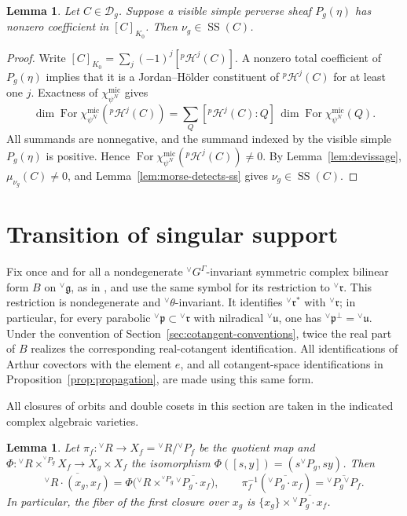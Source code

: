 \documentclass[10pt]{amsart}
\numberwithin{equation}{section}
\theoremstyle{plain}
\newtheorem{lemma}[proposition]{Lemma}
\theoremstyle{definition}
\theoremstyle{remark}
\DeclareMathOperator{\For}{For}
\newcommand{\fg}{\mathfrak g}
\newcommand{\fr}{\mathfrak r}
\newcommand{\fp}{\mathfrak p}
\newcommand{\fu}{\mathfrak u}
\newcommand{\vG}{{}^{\vee}G}
\newcommand{\vR}{{}^{\vee}R}
\newcommand{\vP}{{}^{\vee}P}
\newcommand{\vfg}{{}^{\vee}\fg}
\newcommand{\vfr}{{}^{\vee}\fr}
\newcommand{\vfp}{{}^{\vee}\fp}
\newcommand{\vfu}{{}^{\vee}\fu}
\newcommand{\vtheta}{{}^{\vee}\theta}
\newcommand{\mic}{\mathrm{mic}}
\newcommand{\SSupp}{\operatorname{SS}}
\begin{document}
\begin{lemma}\label{lem:no-cancellation}
Let $C\in\mathcal D_g$. Suppose a visible simple perverse sheaf
$P_g(\eta)$ has nonzero coefficient in $[C]_{K_0}$. Then
$\nu_g\in\SSupp(C)$.
\end{lemma}

\begin{proof}
Write $[C]_{K_0}=\sum_j(-1)^j[{}^p\mathcal H^j(C)]$.
A nonzero total coefficient of $P_g(\eta)$ implies that it is a
Jordan--H\"older constituent of ${}^p\mathcal H^j(C)$ for at least one $j$.
Exactness of $\chi_{\psi^N}^{\mic}$ gives
\[
 \dim\For\chi_{\psi^N}^{\mic}({}^p\mathcal H^j(C))
 =\sum_Q[{}^p\mathcal H^j(C):Q]\,
   \dim\For\chi_{\psi^N}^{\mic}(Q).
\]
All summands are nonnegative, and the summand indexed by the visible
simple $P_g(\eta)$ is positive. Hence
$\For\chi_{\psi^N}^{\mic}({}^p\mathcal H^j(C))\neq0$. By
Lemma~\ref{lem:devissage}, $\mu_{\nu_g}(C)\neq0$, and
Lemma~\ref{lem:morse-detects-ss} gives $\nu_g\in\SSupp(C)$.
\end{proof}

\section{Transition of singular support}

Fix once and for all a nondegenerate $\vG^\Gamma$-invariant symmetric
complex bilinear form $B$ on $\vfg$, as in
\cite[Proposition~3.7.1]{AIMV26}, and use the same symbol for its
restriction to $\vfr$. This restriction is nondegenerate and
$\vtheta$-invariant. It identifies $\vfr^*$ with $\vfr$; in particular,
for every parabolic $\vfp\subset\vfr$ with nilradical $\vfu$, one has
$\vfp^\perp=\vfu$. Under the convention of
Section~\ref{sec:cotangent-conventions}, twice the real part of $B$
realizes the corresponding real-cotangent identification. All
identifications of Arthur covectors with the element $e$, and all
cotangent-space identifications in Proposition~\ref{prop:propagation},
are made using this same form.

All closures of orbits and double cosets in this section are taken in the
indicated complex algebraic varieties.

\begin{lemma}\label{lem:diagonal-orbit-closure}
Let $\pi_f:\vR\to X_f=\vR/\vP_f$ be the quotient map and
$\Phi:\vR\times^{\vP_g}X_f\to X_g\times X_f$ the isomorphism
$\Phi([s,y])=(s\vP_g,sy)$. Then
\[
 \overline{\vR\cdot(x_g,x_f)}
 =\Phi\bigl(\vR\times^{\vP_g}
        \overline{\vP_g\cdot x_f}\bigr),
 \qquad
 \pi_f^{-1}(\overline{\vP_g\cdot x_f})
 =\overline{\vP_g\vP_f}.
\]
In particular, the fiber of the first closure over $x_g$ is
$\{x_g\}\times\overline{\vP_g\cdot x_f}$.
\end{lemma}
\end{document}
